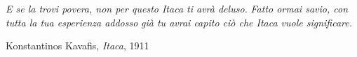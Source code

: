 \begin{dedication}
\textit{E se la trovi povera, non per questo Itaca ti avrà deluso.}\newline
\textit{Fatto ormai savio, con tutta la tua esperienza addosso}\newline
\textit{già tu avrai capito ciò che Itaca vuole significare.}\newline
\vspace{0.3cm}

\textnormal{Konstantinos Kavafis, \textit{Itaca}, 1911}
\end{dedication}
